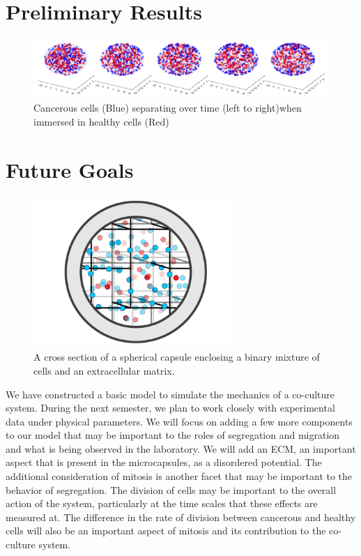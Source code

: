 \documentclass[aps,prb,twocolumn,groupedaddress,nofootinbib,floatfix]{revtex4}
\begin{document}
\section*{Preliminary Results}

\begin{widetext}
\begin{figure}
  \includegraphics[width=\textwidth]{separation.png}
  \caption[separation]
    {Cancerous cells (Blue) separating over time (left to right)when immersed in healthy cells (Red)}
   \label{fig:separation}
\end{figure}
\end{widetext}

\section*{Future Goals}

\begin{figure}
  \includegraphics[width=3in]{Fig2.png}
  \caption[capsuleECM]
   {A cross section of a spherical capsule enclosing a binary mixture of 
   cells and an extracellular matrix.}
   \label{fig:capsuleECM}
\end{figure}

We have constructed a basic model to simulate the mechanics of a co-culture system. During the next semester, we plan to work closely with experimental data under physical parameters. We will focus on adding a few more components to our model that may be important to the roles of segregation and migration and what is being observed in the laboratory.
We will add an ECM, an important aspect that is present in the microcapsules, as a disordered potential.
The additional consideration of mitosis is another facet that may be important to the behavior of segregation. The division of cells may be important to the overall action of the system, particularly at the time scales that these effects are measured at. The difference in the rate of division between cancerous and healthy cells will also be an important aspect of mitosis and its contribution to the co-culture system.
\end{document}
